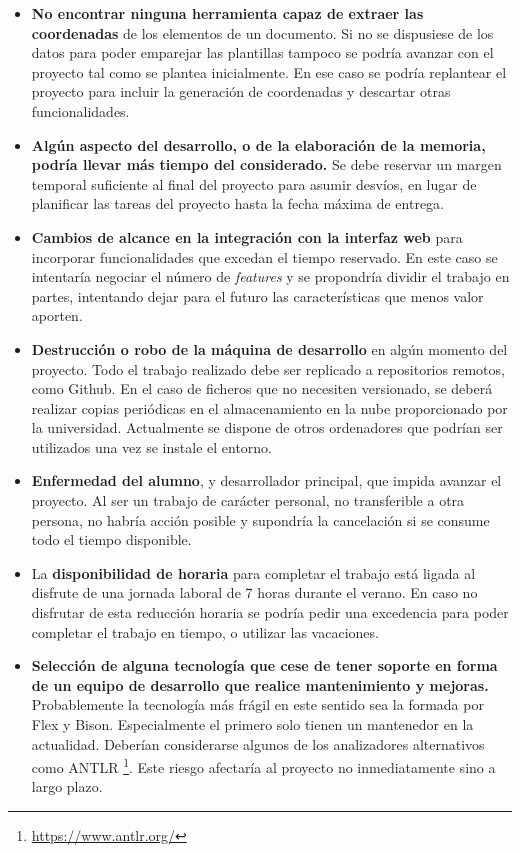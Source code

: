 \begin{itemize}
	\item \textbf{No encontrar ninguna herramienta capaz de extraer las coordenadas} de los elementos de un documento. Si no se dispusiese de los datos para poder emparejar las plantillas tampoco se podría avanzar con el proyecto tal como se plantea inicialmente. En ese caso se podría replantear el proyecto para incluir la generación de coordenadas y descartar otras funcionalidades.
	
	\item \textbf{Algún aspecto del desarrollo, o de la elaboración de la memoria, podría llevar más tiempo del considerado.} Se debe reservar un margen temporal suficiente al final del proyecto para asumir desvíos, en lugar de planificar las tareas del proyecto hasta la fecha máxima de entrega.
	
	\item \textbf{Cambios de alcance en la integración con la interfaz web} para incorporar funcionalidades que excedan el tiempo reservado. En este caso se intentaría negociar el número de \emph{features} y se propondría dividir el trabajo en partes, intentando dejar para el futuro las características que menos valor aporten.
	
	\item \textbf{Destrucción o robo de la máquina de desarrollo} en algún momento del proyecto. Todo el trabajo realizado debe ser replicado a repositorios remotos, como Github. En el caso de ficheros que no necesiten versionado, se deberá realizar copias periódicas en el almacenamiento en la nube proporcionado por la universidad. Actualmente se dispone de otros ordenadores que podrían ser utilizados una vez se instale el entorno.

	\item \textbf{Enfermedad del alumno}, y desarrollador principal, que impida avanzar el proyecto. Al ser un trabajo de carácter personal, no transferible a otra persona, no habría acción posible y supondría la cancelación si se consume todo el tiempo disponible.

	\item La \textbf{disponibilidad de horaria} para completar el trabajo está ligada al disfrute de una jornada laboral de 7 horas durante el verano. En caso no disfrutar de esta reducción horaria se podría pedir una excedencia para poder completar el trabajo en tiempo, o utilizar las vacaciones.

	\item \textbf{Selección de alguna tecnología que cese de tener soporte en forma de un equipo de desarrollo que realice mantenimiento y mejoras.} Probablemente la tecnología más frágil en este sentido sea la formada por Flex y Bison. Especialmente el primero solo tienen un mantenedor en la actualidad. Deberían considerarse algunos de los analizadores alternativos como ANTLR \footnote{\url{https://www.antlr.org/}}. Este riesgo afectaría al proyecto no inmediatamente sino a largo plazo.


\end{itemize}

